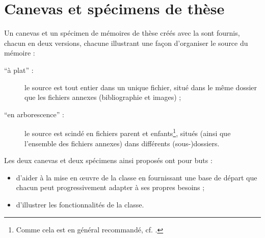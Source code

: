 \chapter{Canevas et spécimens de thèse}\label{cha-specimen-canevas}%
%
%

Un canevas et un spécimen de mémoires de thèse créés avec la \yatCl{} sont
fournis, chacun en deux versions, chacune illustrant une façon d'organiser le
source  du mémoire :
\begin{description}
\item[\enquote{à plat} :] le source est tout entier dans un unique fichier,
  situé dans le même dossier que les fichiers annexes (bibliographie et
  images) ;
\item[\enquote{en arborescence} :]%
  le source est scindé en fichiers parent et enfants\footnote{Comme cela est en
    général recommandé, cf. .}, situés (ainsi que
  l'ensemble des fichiers annexes) dans différents (sous-)dossiers.
\end{description}
Les deux canevas et deux spécimens ainsi proposés ont pour buts :
\begin{itemize}
\item d'aider à la mise en œuvre de la classe en fournissant une base de départ
  que chacun peut progressivement adapter à ses propres
  besoins ;
\item d'illustrer les fonctionnalités de la classe.
\end{itemize}

